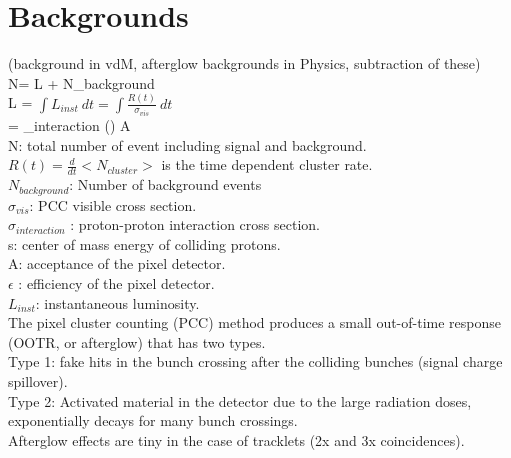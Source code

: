 \newpage \section{Backgrounds}
\label{sec:bkg}
(background in vdM, afterglow backgrounds in Physics, subtraction of these) \\

N= \sigma \:L + N_{background} \\

L = $ \int L_{inst} \: dt = \int \frac{R(t)}{\sigma_{vis}} \:dt $  \\

\sigma = \sigma_{interaction} () \: A \:\epsilon\\

N: total number of event including signal and background. \\

$R(t) = \frac{d}{dt} <N_{cluster}>$ is the time dependent cluster rate. \\

$N_{background}$: Number of background events \\

$\sigma_{vis}$: PCC visible cross section.\\

$\sigma_{interaction}$ : proton-proton interaction cross section. \\

s: center of mass energy of colliding protons. \\

A: acceptance of the pixel detector. \\

$\epsilon$ : efficiency of the pixel detector. \\

$L_{inst}$: instantaneous luminosity.\\

The pixel cluster counting (PCC) method produces a small out-of-time response (OOTR, or afterglow) that has two types.\\

Type 1: fake hits in the bunch crossing after the colliding bunches (signal charge spillover).\\

Type 2: Activated material in the detector due to the large radiation doses, exponentially decays for many bunch crossings.\\

Afterglow effects are tiny in the case of tracklets (2x and 3x coincidences).\\

